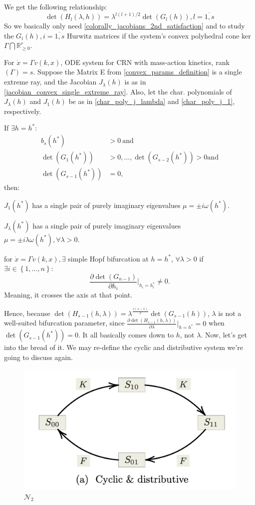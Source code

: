 \begin{proposition}
	We get the following relationship:
	\[
		\det\left(H_l(\lambda,h)\right)=\lambda^{l(l+1)/2}\det\left(G_l(h)\right),l=\overline{1,s}
	\]
	So we basically only need \ref{colorally_jacobians_2nd_satisfaction} and to study the $G_i(h), i = \overline{1,s}$ Hurwitz matrices if the system's convex polyhedral cone ker$\Gamma \bigcap \mathbb{R}^r_{\geq 0}$.
\end{proposition}
\begin{proposition}
	For $\dot{x} = \Gamma v(k,x)$, ODE system for CRN with mass-action kinetics, rank$(\Gamma) = s$. Suppose the Matrix E from \ref{convex_params_definition} is a single extreme ray, and the Jacobian $J_\lambda(h)$ is as in \ref{jacobian_convex_single_extreme_ray}.
	Also, let the char. polynomials of $J_\lambda(h)$ and $J_1(h)$ be as in \ref{char_poly_j_lambda} and \ref{char_poly_j_1}, respectively.

	If $\exists h = h^* :$
	\[
		\begin{aligned}
			b_s(h^*)&\mathrm{>0~and}\\\det(G_1(h^*))&>0,...,\det(G_{s-2}(h^*))>0\mathrm{and}\\\det(G_{s-1}(h^*))&=0,
		\end{aligned}
	\]
	then:

	 $J_1(h^*)$ has a single pair of purely imaginary eigenvalues $\mu = \pm i \omega(h^*)$.

	 $J_\lambda(h^*)$ has a single pair of purely imaginary eigenvalues $\mu = \pm i \lambda \omega(h^*), \forall \lambda > 0$.

	 for $\dot{x} = \Gamma v(k,x), \exists$ simple Hopf	 bifurcation at $h = h^*$, $\forall \lambda > 0$ if $\exists i \in \left\{ 1 , \ldots , n \right\}:$
	\[
		\frac{\partial\det(G_{n-1})}{\partial h_i}|_{h_i=h_i^*}\neq0.
	\]
	Meaning, it crosses the axis at that point.
\end{proposition}
Hence, because $\det(H_{s-1}(h,\lambda))=\lambda^{\frac{s(s-1)}{2}}\det(G_{s-1}(h))$, $\lambda$ is not a well-suited bifurcation parameter, since $\frac{\partial\det(H_{s-1}(h,\lambda))}{\partial\lambda}|_{h=h^{*}}=0$ when $\det(G_{s-1}(h^{*}))=0$. It all basically comes down to $h$, not $\lambda$.
\hfill\break
Now, let's get into the bread of it. We may re-define the cyclic and distributive system we're going to discuss again.
\begin{figure}[H]
	\includegraphics[width=13cm]{math_pics/cyclic-distributive-n1.png}	
	\centering
	\caption{$\mathcal{N}_2$}
\end{figure}
